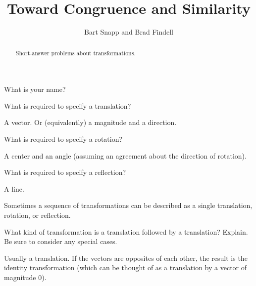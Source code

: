 \documentclass[nooutcomes]{ximera}
\title{Toward Congruence and Similarity}
\author{Bart Snapp and Brad Findell}
\begin{document}
\begin{abstract}
Short-answer problems about transformations. 
\end{abstract}
\maketitle

\begin{question}
What is your name?
\begin{freeResponse}
\end{freeResponse}
\end{question}

\begin{question}
What is required to specify a translation?  
\begin{freeResponse}
\begin{hint}
A vector.  Or (equivalently) a magnitude and a direction.  
\end{hint}
\end{freeResponse}
\end{question}

\begin{question}
What is required to specify a rotation? 
\begin{freeResponse}
\begin{hint}
A center and an angle (assuming an agreement about the direction of rotation).  
\end{hint}
\end{freeResponse}
\end{question}

\begin{question}
What is required to specify a reflection?  
\begin{freeResponse}
\begin{hint}
A line.  
\end{hint}
\end{freeResponse}
\end{question}

Sometimes a sequence of transformations can be described as a single translation, rotation, or reflection.  

\begin{question}
What kind of transformation is a translation followed by a translation?  Explain.  Be sure to consider any special cases.  
\begin{freeResponse}
\begin{hint}
Usually a translation.  If the vectors are opposites of each other, the result is the identity transformation (which can be thought of as a translation by a vector of magnitude $0$).
\end{hint}
\end{freeResponse}
\end{question}
\end{document}
